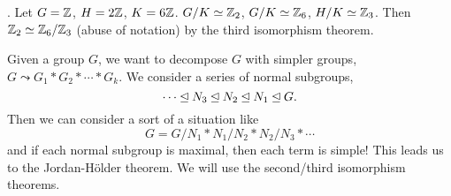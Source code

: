 \ex. Let \(G = \mathbb{Z}\), \(H = 2\mathbb{Z}\), \(K = 6\mathbb{Z}\). \(G/K \simeq \mathbb{Z}_2\), \(G/K \simeq \mathbb{Z}_6\), \(H/K \simeq \mathbb{Z}_3\). Then \(\mathbb{Z}_2 \simeq \mathbb{Z}_6 / \mathbb{Z}_3\) (abuse of notation) by the third isomorphism theorem.


Given a group \(G\), we want to decompose \(G\) with simpler groups, \(G \leadsto G_1 * G_2 * \cdots * G_k\). We consider a series of normal subgroups,
\[
    \cdots \unlhd N_3 \unlhd N_2 \unlhd N_1 \unlhd G.
\]
Then we can consider a sort of a situation like
\[
    G = G/N_1 * N_1 / N_2 * N_2 / N_3 * \cdots
\]
and if each normal subgroup is maximal, then each term is simple! This leads us to the Jordan-Hölder theorem. We will use the second/third isomorphism theorems.


\pagebreak
